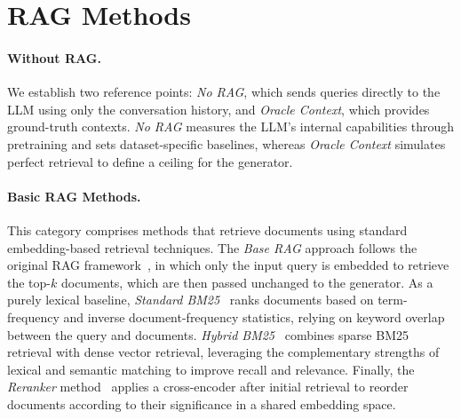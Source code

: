 \documentclass[11pt]{article}
\begin{document}
\section{RAG Methods} \label{sec:rag}

\paragraph{Without RAG.}
We establish two reference points: \textit{No RAG}, which sends queries directly to the LLM using only the conversation history, and \textit{Oracle Context}, which provides ground-truth contexts.
\textit{No RAG} measures the LLM's internal capabilities through pretraining and sets dataset-specific baselines, whereas \textit{Oracle Context }simulates perfect retrieval to define a ceiling for the generator. 

\paragraph{Basic RAG Methods.}
This category comprises methods that retrieve documents using standard embedding-based retrieval techniques. The \emph{Base RAG} approach follows the original RAG framework~\cite{lewis_retrievalaugmented_2020}, in which only the input query is embedded to retrieve the top-$k$ documents, which are then passed unchanged to the generator. As a purely lexical baseline, \emph{Standard BM25}~\cite{robertson_probabilistic_2009} ranks documents based on term-frequency and inverse document-frequency statistics, relying on keyword overlap between the query and documents. \emph{Hybrid BM25}~\cite{gao_complement_2021} combines sparse BM25 retrieval with dense vector retrieval, leveraging the complementary strengths of lexical and semantic matching to improve recall and relevance. Finally, the \emph{Reranker} method~\cite{glass-etal-2022-re2g} applies a cross-encoder after initial retrieval to reorder documents according to their significance in a shared embedding space.
\end{document}
